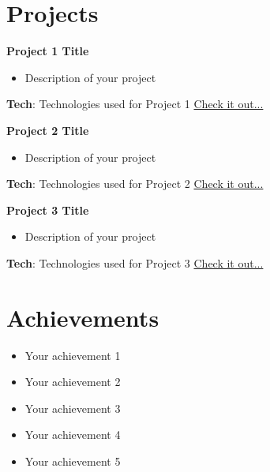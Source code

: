 \documentclass[a4paper,11pt]{article}
\newcommand{\resumeItemListStart}{\begin{itemize}[label={$\bullet$}, leftmargin=*]}
\newcommand{\resumeItemListEnd}{\end{itemize}\vspace{-5pt}}
\begin{document}
\section{\textbf{{\LARGE Projects}}}
\begin{description}[font=$\bullet$]

  \item{\textbf{Project 1 Title}}
  \resumeItemListStart
    \item Description of your project
  \resumeItemListEnd
  \textbf{Tech}: Technologies used for Project 1
  \hfill \textcolor{blue}{\href{https://project1-link}{Check it out...}}

  \item{\textbf{Project 2 Title}}
  \resumeItemListStart
    \item Description of your project
  \resumeItemListEnd
  \textbf{Tech}: Technologies used for Project 2
  \hfill \textcolor{blue}{\href{https://project2-link}{Check it out...}}

  \item{\textbf{Project 3 Title}}
  \resumeItemListStart
    \item Description of your project
  \resumeItemListEnd
  \textbf{Tech}: Technologies used for Project 3
  \hfill \textcolor{blue}{\href{https://project3-link}{Check it out...}}
\end{description}


\section{\textbf{{\LARGE Achievements}}}
\begin{itemize}[label={$\bullet$}, leftmargin=*]

\item Your achievement 1
\item Your achievement 2
\item Your achievement 3
\item Your achievement 4
\item Your achievement 5 
\end{itemize}
\end{document}

